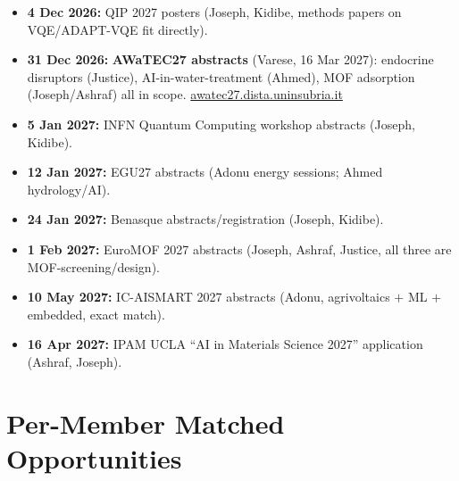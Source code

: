 \documentclass[11pt,a4paper]{article}
\begin{document}
\begin{itemize}[leftmargin=1.4em]
  \item \textbf{4 Dec 2026:} QIP 2027 posters (Joseph, Kidibe, methods papers on VQE/ADAPT-VQE fit directly).
  \item \textbf{31 Dec 2026:} \textbf{AWaTEC27 abstracts} (Varese, 16 Mar 2027): endocrine disruptors (Justice), AI-in-water-treatment (Ahmed), MOF adsorption (Joseph/Ashraf) all in scope. \href{https://awatec27.dista.uninsubria.it/}{awatec27.dista.uninsubria.it}
  \item \textbf{5 Jan 2027:} INFN Quantum Computing workshop abstracts (Joseph, Kidibe).
  \item \textbf{12 Jan 2027:} EGU27 abstracts (Adonu energy sessions; Ahmed hydrology/AI).
  \item \textbf{24 Jan 2027:} Benasque abstracts/registration (Joseph, Kidibe).
  \item \textbf{1 Feb 2027:} EuroMOF 2027 abstracts (Joseph, Ashraf, Justice, all three are MOF-screening/design).
  \item \textbf{10 May 2027:} IC-AISMART 2027 abstracts (Adonu, agrivoltaics $+$ ML $+$ embedded, exact match).
  \item \textbf{16 Apr 2027:} IPAM UCLA ``AI in Materials Science 2027'' application (Ashraf, Joseph).
\end{itemize}

\section{Per-Member Matched Opportunities}
\end{document}
